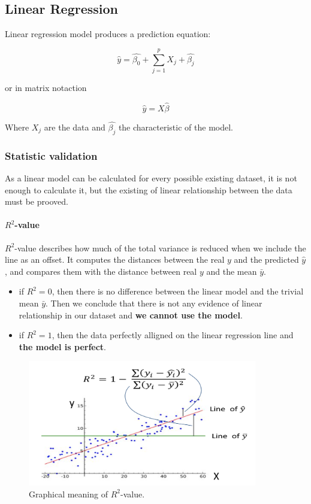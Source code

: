 \subsection{Linear Regression}

Linear regression model produces a prediction equation:

$$
\hat{y} = \hat{\beta_0} + \sum\limits_{j=1}^p  X_j + \hat{ \beta_j}
$$

or in matrix notaction

$$
\hat{y} =X \hat{ \beta}
$$

Where $X_j$ are the data and $\hat{\beta_j}$ the characteristic of the model. 

\subsubsection{Statistic validation}

As a linear model can be calculated for every possible existing dataset, it is not enough to calculate it, but the existing of linear relationship between the data must be prooved.

\paragraph{$R^2$-value}

$R^2$-value describes how much of the total variance is reduced when we include the line as an offset. It computes the distances between the real $y$ and the predicted $\hat{y}$, and compares them with the distance between real $y$ and the mean $\bar{y}$.

\begin{itemize}
\item if $R^2 = 0$, then there is no difference between the linear model and the trivial mean $\bar{y}$. Then we conclude that there is not any evidence of linear relationship in our dataset and \textbf{we cannot use the model}.
\item if $R^2 = 1$, then the data perfectly alligned on the linear regression line and \textbf{the model is perfect}.
\end{itemize}

\begin{figure}[H]%
 \centering
 \includegraphics[width=10cm]{./img/07/r_2.png}
 \caption{\label{pic:r_2} Graphical meaning of $R^2$-value.}
\end{figure}


